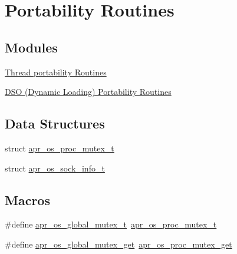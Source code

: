 \hypertarget{group__apr__portabile}{\section{Portability Routines}
\label{group__apr__portabile}
}
\subsection*{Modules}
\begin{DoxyCompactItemize}
\item 
\hyperlink{group__apr__os__thread}{Thread portability Routines}
\item 
\hyperlink{group__apr__os__dso}{D\-S\-O (\-Dynamic Loading) Portability Routines}
\end{DoxyCompactItemize}
\subsection*{Data Structures}
\begin{DoxyCompactItemize}
\item 
struct \hyperlink{structapr__os__proc__mutex__t}{apr\-\_\-os\-\_\-proc\-\_\-mutex\-\_\-t}
\item 
struct \hyperlink{structapr__os__sock__info__t}{apr\-\_\-os\-\_\-sock\-\_\-info\-\_\-t}
\end{DoxyCompactItemize}
\subsection*{Macros}
\begin{DoxyCompactItemize}
\item 
\#define \hyperlink{group__apr__portabile_gadd3a9818afc16248c3c30f22e19838dd}{apr\-\_\-os\-\_\-global\-\_\-mutex\-\_\-t}~\hyperlink{structapr__os__proc__mutex__t}{apr\-\_\-os\-\_\-proc\-\_\-mutex\-\_\-t}
\item 
\#define \hyperlink{group__apr__portabile_gae9be7821e8c021915c930fc83d6d4a73}{apr\-\_\-os\-\_\-global\-\_\-mutex\-\_\-get}~\hyperlink{group__apr__portabile_ga2003a3142f05675696268053b2fddbe1}{apr\-\_\-os\-\_\-proc\-\_\-mutex\-\_\-get}
\end{DoxyCompactItemize}
